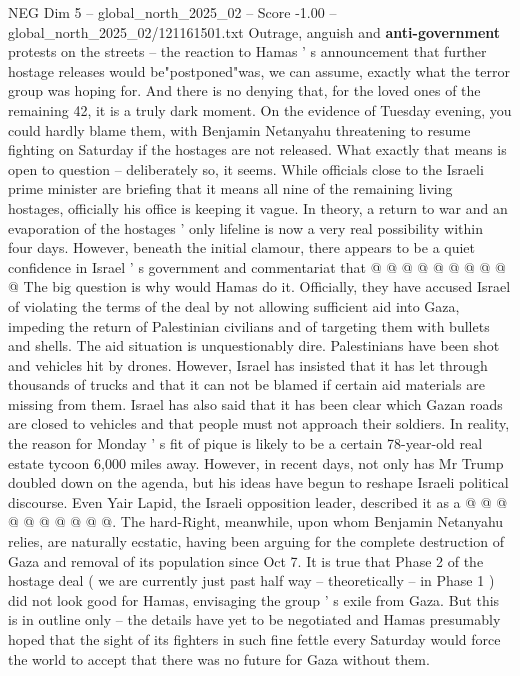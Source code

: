 \begin{textsample}{NEG Dim 5 – global\_north\_2025\_02 – Score -1.00 – global\_north\_2025\_02/121161501.txt}  \label{ex:f5_neg_244}
Outrage, anguish and \textbf{anti-government} protests on the streets -- the reaction to Hamas ' s announcement that further hostage releases would be"postponed"was, we can assume, exactly what the terror group was hoping for.
And there is no denying that, for the loved ones of the remaining 42, it is a truly dark moment.
On the evidence of Tuesday evening, you could hardly blame them, with Benjamin Netanyahu threatening to resume fighting on Saturday if the hostages are not released.
What exactly that means is open to question -- deliberately so, it seems.
While officials close to the Israeli prime minister are briefing that it means all nine of the remaining living hostages, officially his office is keeping it vague.
In theory, a return to war and an evaporation of the hostages ' only lifeline is now a very real possibility within four days.
However, beneath the initial clamour, there appears to be a quiet confidence in Israel ' s government and commentariat that @ @ @ @ @ @ @ @ @ @ The big question is why would Hamas do it.
Officially, they have accused Israel of violating the terms of the deal by not allowing sufficient aid into Gaza, impeding the return of Palestinian civilians and of targeting them with bullets and shells.
The aid situation is unquestionably dire.
Palestinians have been shot and vehicles hit by drones.
However, Israel has insisted that it has let through thousands of trucks and that it can not be blamed if certain aid materials are missing from them.
Israel has also said that it has been clear which Gazan roads are closed to vehicles and that people must not approach their soldiers.
In reality, the reason for Monday ' s fit of pique is likely to be a certain 78-year-old real estate tycoon 6,000 miles away.
However, in recent days, not only has Mr Trump doubled down on the agenda, but his ideas have begun to reshape Israeli political discourse.
Even Yair Lapid, the Israeli opposition leader, described it as a @ @ @ @ @ @ @ @ @ @.
The hard-Right, meanwhile, upon whom Benjamin Netanyahu relies, are naturally ecstatic, having been arguing for the complete destruction of Gaza and removal of its population since Oct 7.
It is true that Phase 2 of the hostage deal ( we are currently just past half way -- theoretically -- in Phase 1 ) did not look good for Hamas, envisaging the group ' s exile from Gaza.
But this is in outline only -- the details have yet to be negotiated and Hamas presumably hoped that the sight of its fighters in such fine fettle every Saturday would force the world to accept that there was no future for Gaza without them.

\end{textsample}
